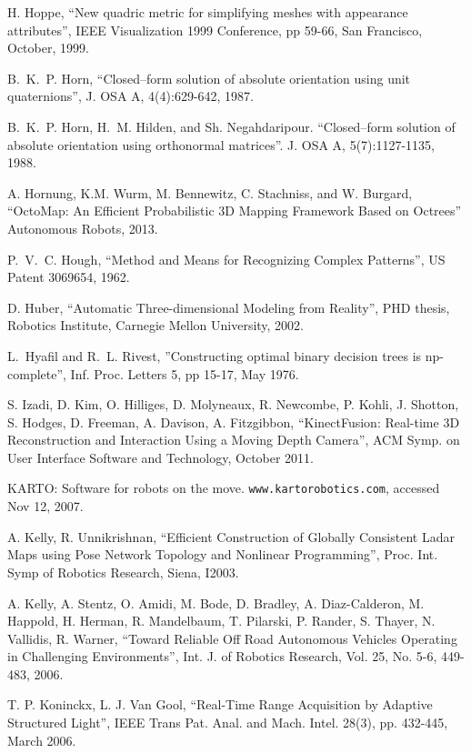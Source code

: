 \documentclass[twocolumn,oneside]{book}
\begin{document}
\begin{thebibliography}{99}
H. Hoppe,	
``New quadric metric for simplifying meshes with appearance attributes'',
IEEE Visualization 1999 Conference, pp 59-66, San Francisco, October, 1999.

B.~K.~P. Horn,
``Closed--form solution of absolute orientation using unit quaternions'',
J. OSA A, 4(4):629-642, 1987.

B.~K.~P. Horn, H.~M. Hilden, and Sh. Negahdaripour.
``Closed--form solution of absolute orientation using orthonormal matrices''.
J. OSA A, 5(7):1127-1135, 1988.

A. Hornung, K.M. Wurm, M. Bennewitz, C. Stachniss, and W. Burgard,
``OctoMap: An Efficient Probabilistic 3D Mapping Framework Based on Octrees''
Autonomous Robots, 2013.

P.~V.~C. Hough,
``Method and Means for Recognizing Complex Patterns'',
US Patent 3069654, 1962.

D. Huber,
``Automatic Three-dimensional Modeling from Reality'',
PHD thesis, Robotics Institute, Carnegie Mellon University, 2002.

L.~Hyafil and R.~L. Rivest,
''Constructing optimal binary decision trees is np-complete'',
Inf. Proc. Letters 5, pp 15-17, May 1976.

S. Izadi, D. Kim, O. Hilliges, D. Molyneaux, R. Newcombe, P. Kohli,
J. Shotton, S. Hodges, D. Freeman, A. Davison, A. Fitzgibbon,
``KinectFusion: Real-time 3D Reconstruction and Interaction Using a Moving Depth Camera'',
ACM Symp. on User Interface Software and Technology, October 2011.

KARTO: Software for robots on the move.
\verb+www.kartorobotics.com+, accessed Nov 12, 2007.


A. Kelly, R. Unnikrishnan,
``Efficient Construction of Globally Consistent Ladar Maps using Pose Network Topology
and Nonlinear Programming'',
Proc. Int. Symp of Robotics Research, Siena, I2003.

A. Kelly, A. Stentz, O. Amidi, M. Bode, D. Bradley, A. Diaz-Calderon, M. Happold, H. Herman, R. Mandelbaum,
T. Pilarski, P. Rander, S. Thayer, N. Vallidis, R. Warner,
``Toward Reliable Off Road Autonomous Vehicles Operating in Challenging Environments'',
Int. J. of Robotics Research, Vol. 25, No. 5-6, 449-483, 2006.

T. P. Koninckx, L. J. Van Gool,
``Real-Time Range Acquisition by Adaptive Structured Light'',
IEEE Trans Pat. Anal. and Mach. Intel. 28(3), pp. 432-445, March 2006. 


\end{thebibliography}
\end{document}
